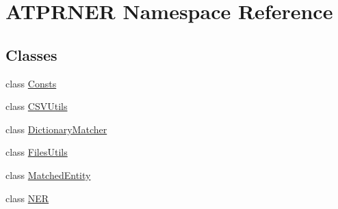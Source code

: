 \hypertarget{namespace_a_t_p_r_n_e_r}{}\section{A\+T\+P\+R\+N\+ER Namespace Reference}
\label{namespace_a_t_p_r_n_e_r}
\subsection*{Classes}
\begin{DoxyCompactItemize}
\item 
class \hyperlink{class_a_t_p_r_n_e_r_1_1_consts}{Consts}
\item 
class \hyperlink{class_a_t_p_r_n_e_r_1_1_c_s_v_utils}{C\+S\+V\+Utils}
\item 
class \hyperlink{class_a_t_p_r_n_e_r_1_1_dictionary_matcher}{Dictionary\+Matcher}
\item 
class \hyperlink{class_a_t_p_r_n_e_r_1_1_files_utils}{Files\+Utils}
\item 
class \hyperlink{class_a_t_p_r_n_e_r_1_1_matched_entity}{Matched\+Entity}
\item 
class \hyperlink{class_a_t_p_r_n_e_r_1_1_n_e_r}{N\+ER}
\end{DoxyCompactItemize}
